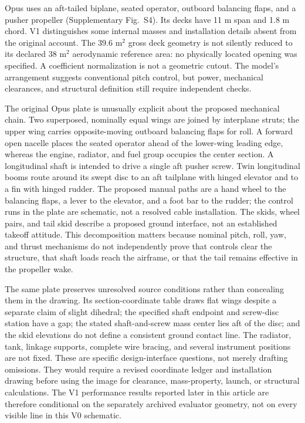 \documentclass[11pt,a4paper]{article}
\begin{document}
Opus uses an aft-tailed biplane, seated operator, outboard balancing flaps, and a pusher propeller (Supplementary Fig.~S4). Its decks have 11 m span and 1.8 m chord. V1 distinguishes some internal masses and installation details absent from the original account. The 39.6 m$^2$ gross deck geometry is not silently reduced to its declared 38 m$^2$ aerodynamic reference area: no physically located opening was specified. A coefficient normalization is not a geometric cutout. The model's arrangement suggests conventional pitch control, but power, mechanical clearances, and structural definition still require independent checks.



The original Opus plate is unusually explicit about the proposed mechanical chain. Two superposed, nominally equal wings are joined by interplane struts; the upper wing carries opposite-moving outboard balancing flaps for roll. A forward open nacelle places the seated operator ahead of the lower-wing leading edge, whereas the engine, radiator, and fuel group occupies the center section. A longitudinal shaft is intended to drive a single aft pusher screw. Twin longitudinal booms route around its swept disc to an aft tailplane with hinged elevator and to a fin with hinged rudder. The proposed manual paths are a hand wheel to the balancing flaps, a lever to the elevator, and a foot bar to the rudder; the control runs in the plate are schematic, not a resolved cable installation. The skids, wheel pairs, and tail skid describe a proposed ground interface, not an established takeoff attitude. This decomposition matters because nominal pitch, roll, yaw, and thrust mechanisms do not independently prove that controls clear the structure, that shaft loads reach the airframe, or that the tail remains effective in the propeller wake.

The same plate preserves unresolved source conditions rather than concealing them in the drawing. Its section-coordinate table draws flat wings despite a separate claim of slight dihedral; the specified shaft endpoint and screw-disc station have a gap; the stated shaft-and-screw mass center lies aft of the disc; and the skid elevations do not define a consistent ground contact line. The radiator, tank, linkage supports, complete wire bracing, and several instrument positions are not fixed. These are specific design-interface questions, not merely drafting omissions. They would require a revised coordinate ledger and installation drawing before using the image for clearance, mass-property, launch, or structural calculations. The V1 performance results reported later in this article are therefore conditional on the separately archived evaluator geometry, not on every visible line in this V0 schematic.
\end{document}
